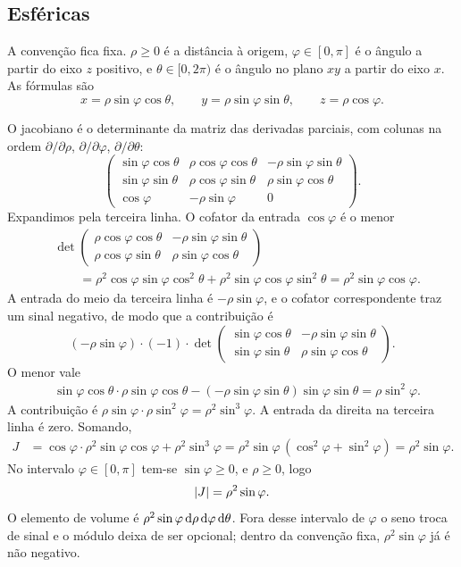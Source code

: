 \documentclass[11pt,a4paper]{article}
\begin{document}
\subsection{Esféricas}

A convenção fica fixa. $\rho\ge 0$ é a distância à origem, $\varphi\in[0,\pi]$ é o ângulo a partir do eixo $z$ positivo, e $\theta\in[0,2\pi)$ é o ângulo no plano $xy$ a partir do eixo $x$. As fórmulas são
\[
x=\rho\sin\varphi\cos\theta,\qquad
y=\rho\sin\varphi\sin\theta,\qquad
z=\rho\cos\varphi.
\]

O jacobiano é o determinante da matriz das derivadas parciais, com colunas na ordem $\partial/\partial\rho$, $\partial/\partial\varphi$, $\partial/\partial\theta$:
\[
\begin{pmatrix}
\sin\varphi\cos\theta & \rho\cos\varphi\cos\theta & -\rho\sin\varphi\sin\theta \\
\sin\varphi\sin\theta & \rho\cos\varphi\sin\theta & \rho\sin\varphi\cos\theta \\
\cos\varphi & -\rho\sin\varphi & 0
\end{pmatrix}.
\]
Expandimos pela terceira linha. O cofator da entrada $\cos\varphi$ é o menor
\begin{align*}
&\det\begin{pmatrix}
\rho\cos\varphi\cos\theta & -\rho\sin\varphi\sin\theta \\
\rho\cos\varphi\sin\theta & \rho\sin\varphi\cos\theta
\end{pmatrix}\\
&\qquad=\rho^2\cos\varphi\sin\varphi\cos^2\theta+\rho^2\sin\varphi\cos\varphi\sin^2\theta
=\rho^2\sin\varphi\cos\varphi.
\end{align*}
A entrada do meio da terceira linha é $-\rho\sin\varphi$, e o cofator correspondente traz um sinal negativo, de modo que a contribuição é
\[
(-\rho\sin\varphi)\cdot(-1)\cdot
\det\begin{pmatrix}
\sin\varphi\cos\theta & -\rho\sin\varphi\sin\theta \\
\sin\varphi\sin\theta & \rho\sin\varphi\cos\theta
\end{pmatrix}.
\]
O menor vale
\begin{align*}
&\sin\varphi\cos\theta\cdot\rho\sin\varphi\cos\theta
-(-\rho\sin\varphi\sin\theta)\sin\varphi\sin\theta
=\rho\sin^2\varphi.
\end{align*}
A contribuição é $\rho\sin\varphi\cdot\rho\sin^2\varphi=\rho^2\sin^3\varphi$. A entrada da direita na terceira linha é zero. Somando,
\begin{align*}
J
&=\cos\varphi\cdot\rho^2\sin\varphi\cos\varphi+\rho^2\sin^3\varphi
=\rho^2\sin\varphi\,(\cos^2\varphi+\sin^2\varphi)
=\rho^2\sin\varphi.
\end{align*}
No intervalo $\varphi\in[0,\pi]$ tem-se $\sin\varphi\ge 0$, e $\rho\ge 0$, logo
\[
\left\lvert J \right\rvert=\rho^2\sin\varphi.
\]
O elemento de volume é $\rho^2\sin\varphi\,\mathrm{d}\rho\,\mathrm{d}\varphi\,\mathrm{d}\theta$. Fora desse intervalo de $\varphi$ o seno troca de sinal e o módulo deixa de ser opcional; dentro da convenção fixa, $\rho^2\sin\varphi$ já é não negativo.
\end{document}
